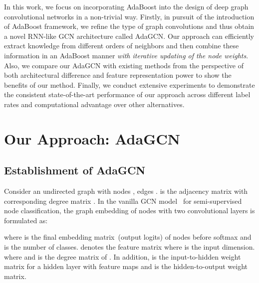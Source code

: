 \documentclass{article} \usepackage{iclr2021_conference,times}
\begin{document}
In this work, we focus on incorporating AdaBoost into the design of deep graph convolutional networks in a non-trivial way. Firstly, in pursuit of the introduction of AdaBoost framework, we refine the type of graph convolutions and thus obtain a novel RNN-like GCN architecture called AdaGCN. Our approach can efficiently extract knowledge from different orders of neighbors and then combine these information in an AdaBoost manner \emph{with iterative updating of the node weights}. Also, we compare our AdaGCN with existing methods from the perspective of both architectural difference and feature representation power to show the benefits of our method. Finally, we conduct  extensive experiments to demonstrate the consistent state-of-the-art performance of our approach across different label rates and computational advantage over other alternatives. 

\section{Our Approach: AdaGCN}

\subsection{Establishment of AdaGCN} \label{approach_establish}
Consider an undirected graph  with  nodes , edges .  is the adjacency matrix with corresponding degree matrix . In the vanilla GCN model~\citep{kipf2016semi} for semi-supervised node classification, the graph embedding of nodes with two convolutional layers is formulated as:

where  is the final embedding matrix~(output logits) of nodes before softmax and  is the number of classes.  denotes the feature matrix where  is the input dimension.  where  and  is the degree matrix of . In addition,  is the input-to-hidden weight matrix for a hidden layer with  feature maps and  is the hidden-to-output weight matrix. 
\end{document}
